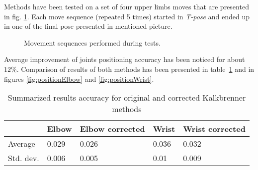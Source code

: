 \documentclass{llncs}
\begin{document}
Methods have been tested on a set of four upper limbs moves that are presented in fig. \ref{fig:poses}. Each move sequence (repeated 5 times) started in \textsl{T-pose} and ended up in one of the final pose presented in mentioned picture. 

\begin{figure}[h!]
	\centering
	\vspace{2.5cm}
	\caption{Movement sequences performed during tests.}
	\label{fig:poses}
\end{figure}

Average improvement of joints positioning accuracy has been noticed for about $12\%$. Comparison of results of both methods has been presented in table~\ref{tab:summary} and in figures \ref{fig:positionElbow} and \ref{fig:positionWrist}. 

\begin{table}[]
	\centering
		
	\caption{Summarized results accuracy for original and corrected Kalkbrenner methods}
	\label{tab:summary}
	\begin{tabular}{l|l|l|l|l|}
		\cline{2-5}
		                                & \multicolumn{1}{c|}{Elbow} & \multicolumn{1}{c|}{Elbow corrected} & \multicolumn{1}{c|}{Wrist} & \multicolumn{1}{c|}{Wrist corrected} \\ \hline
		\multicolumn{1}{|l|}{Average}   & 0.029                      & 0.026                                & 0.036                      & 0.032                                \\ \hline
		\multicolumn{1}{|l|}{Std. dev.} & 0.006                      & 0.005                                & 0.01                       & 0.009                                \\ \hline
	\end{tabular}
	
\end{table}
\end{document}
